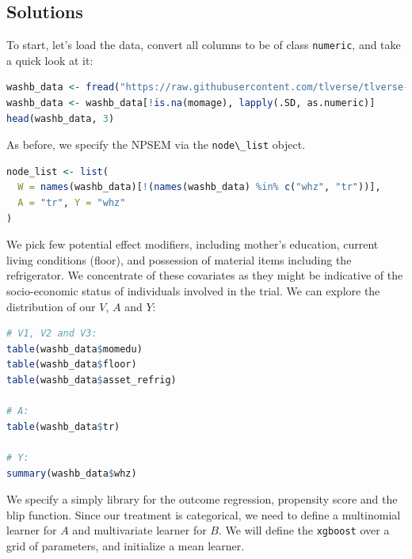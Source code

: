 \documentclass[
  12pt, krantz2,
]{book}
\newcommand{\passthrough}[1]{#1}
\theoremstyle{definition}
\theoremstyle{definition}
\theoremstyle{definition}
\newcommand{\1}{\mathbbm{1}}
\begin{document}
\hypertarget{solutions}{%
\subsection{Solutions}\label{solutions}}

To start, let's load the data, convert all columns to be of class \passthrough{\lstinline!numeric!},
and take a quick look at it:

\begin{lstlisting}[language=R]
washb_data <- fread("https://raw.githubusercontent.com/tlverse/tlverse-data/master/wash-benefits/washb_data.csv", stringsAsFactors = TRUE)
washb_data <- washb_data[!is.na(momage), lapply(.SD, as.numeric)]
head(washb_data, 3)
\end{lstlisting}

As before, we specify the NPSEM via the \passthrough{\lstinline!node\_list!} object.

\begin{lstlisting}[language=R]
node_list <- list(
  W = names(washb_data)[!(names(washb_data) %in% c("whz", "tr"))],
  A = "tr", Y = "whz"
)
\end{lstlisting}

We pick few potential effect modifiers, including mother's education, current
living conditions (floor), and possession of material items including the refrigerator.
We concentrate of these covariates as they might be indicative of the socio-economic status
of individuals involved in the trial. We can explore the distribution of our \(V\), \(A\) and \(Y\):

\begin{lstlisting}[language=R]
# V1, V2 and V3:
table(washb_data$momedu)
table(washb_data$floor)
table(washb_data$asset_refrig)

# A:
table(washb_data$tr)

# Y:
summary(washb_data$whz)
\end{lstlisting}

We specify a simply library for the outcome regression, propensity score
and the blip function. Since our treatment is categorical, we need to define a
multinomial learner for \(A\) and multivariate learner for \(B\). We
will define the \passthrough{\lstinline!xgboost!} over a grid of parameters, and initialize a mean learner.
\end{document}
